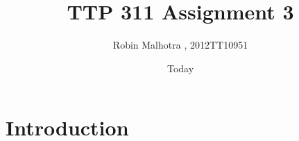 \documentclass[]{article}
\begin{document}
\title{TTP 311 Assignment 3}
\author{Robin Malhotra , 2012TT10951}
\date{Today}
\maketitle

\section*{Introduction}
\end{document}
